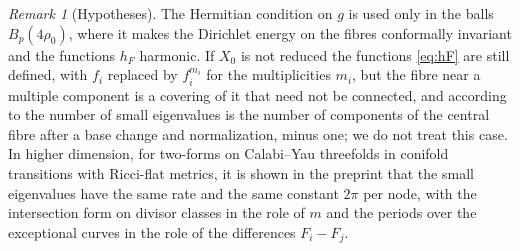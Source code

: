 \documentclass[11pt]{amsart}
\theoremstyle{definition}
\theoremstyle{remark}
\newtheorem{remark}[theorem]{Remark}
\begin{document}
\begin{remark}[Hypotheses]\label{rem:hypotheses}
The Hermitian condition on $g$ is used only in the balls $B_p(4\rho_0)$,
where it makes the Dirichlet energy on the fibres conformally invariant
and the functions $h_F$ harmonic. If $X_0$ is not reduced the functions
\eqref{eq:hF} are still defined, with $f_i$ replaced by $f_i^{m_i}$ for the
multiplicities $m_i$, but the fibre near a multiple component is a
covering of it that need not be connected, and according to \cite[Theorem~0.4]{cao-kahler} the number of small
eigenvalues is the number of components of the central fibre after a base
change and normalization, minus one; we do not treat
this case. In higher dimension, for
two-forms on Calabi--Yau threefolds in conifold transitions with
Ricci-flat metrics, it is shown in the preprint \cite{wuebben-conifold}
that the small eigenvalues have the same rate and the same
constant $2\pi$ per node, with the intersection form on divisor classes in
the role of $m$ and the periods over the exceptional curves in the role of
the differences $F_i-F_j$.
\end{remark}
\end{document}
